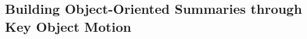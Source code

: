 

\subsection{Building Object-Oriented Summaries through Key Object Motion}
\label{subsec:rel-unsup-object-oriented}



